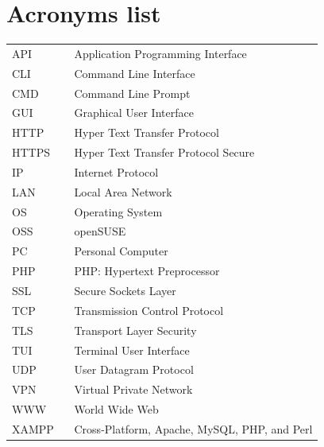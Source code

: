 \documentclass[11pt,a4paper]{report}
\begin{document}
\listoffigures
{}

\listoftables
{}

\lstlistoflistings
{}

\chapter*{Acronyms list}

    \begin{flushleft}
        \begin{tabular}{l p{0.8\linewidth}}
            API     & Application Programming Interface\\
            CLI     & Command Line Interface\\
            CMD     & Command Line Prompt\\
            GUI     & Graphical User Interface\\
            HTTP    & Hyper Text Transfer Protocol\\
            HTTPS   & Hyper Text Transfer Protocol Secure\\
            IP      & Internet Protocol\\
            LAN     & Local Area Network\\
            OS      & Operating System\\
            OSS     & openSUSE\\
            PC      & Personal Computer\\
            PHP     & PHP: Hypertext Preprocessor\\
            SSL     & Secure Sockets Layer\\
            TCP     & Transmission Control Protocol\\
            TLS     & Transport Layer Security\\
            TUI     & Terminal User Interface\\ %
            UDP     & User Datagram Protocol\\
            VPN     & Virtual Private Network\\
            WWW     & World Wide Web\\
            XAMPP   & Cross-Platform, Apache, MySQL, PHP, and Perl
        \end{tabular}
    \end{flushleft}
\end{document}

